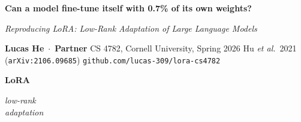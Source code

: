 \documentclass[landscape]{article}
\begin{document}
\begin{darkbox}
  \color{paper}
  \begin{minipage}[c]{0.78\linewidth}
    {\fontsize{52pt}{58pt}\selectfont\bfseries
      Can a model fine-tune itself with 0.7\% of its own weights?}\par
    \vspace{4mm}
    {\fontsize{24pt}{28pt}\selectfont\itshape\color{hi}
      Reproducing LoRA: Low-Rank Adaptation of Large Language Models}\par
    \vspace{4mm}
    {\fontsize{18pt}{22pt}\selectfont
      \textbf{Lucas He} \,$\cdot$\, \textbf{Partner} \quad\textbar\quad CS 4782, Cornell University, Spring 2026
      \quad\textbar\quad Hu \emph{et al.}\ 2021 (\texttt{arXiv:2106.09685})
      \quad\textbar\quad \texttt{github.com/lucas-309/lora-cs4782}}
  \end{minipage}\hfill
  \begin{minipage}[c]{0.20\linewidth}
    \raggedleft
    {\fontsize{110pt}{110pt}\selectfont\bfseries\color{hi}LoRA}\par
    \vspace{1mm}
    {\fontsize{14pt}{18pt}\selectfont\color{paper}\itshape\raggedleft
    low-rank \\ adaptation\par}
  \end{minipage}
\end{darkbox}

\vspace{4mm}
\end{document}
